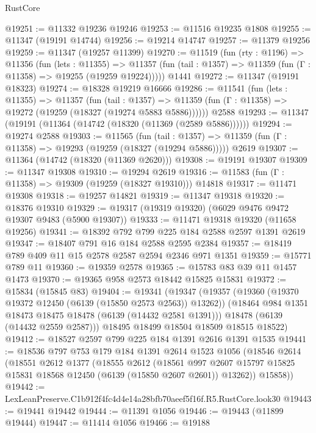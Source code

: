 \begin{lexlean}{RustCore}
\begin{coremodule}
@19251 := @11332 @19236 @19246
@19253 := @11516 @19235 @1808
@19255 := @11347 (@19191 @14744)
@19256 := @19214 @14747
@19257 := @11379 @19256
@19259 := @11347 (@19257 @11399)
@19270 := @11519
    (fun (rty : @1196) =>
    @11356
      (fun (lets : @11355) =>
      @11357 (fun (tail : @1357) => @11359 (fun (Γ : @11358) => @19255 (@19259 @19224)))))
    @1441
@19272 := @11347 (@19191 @18323)
@19274 := @18328 @19219 @16666
@19286 := @11541
    (fun (lets : @11355) =>
    @11357
      (fun (tail : @1357) =>
      @11359 (fun (Γ : @11358) => @19272 (@19259 (@18327 (@19274 @5883 @5886))))))
    @2588
@19293 := @11347 (@19191 (@11364 (@14742 (@18320 (@11369 (@2589 @5886))))))
@19294 := @19274 @2588
@19303 := @11565
    (fun (tail : @1357) => @11359 (fun (Γ : @11358) => @19293 (@19259 (@18327 (@19294 @5886)))))
    @2619
@19307 := @11364 (@14742 (@18320 (@11369 @2620)))
@19308 := @19191 @19307
@19309 := @11347 @19308
@19310 := @19294 @2619
@19316 := @11583 (fun (Γ : @11358) => @19309 (@19259 (@18327 @19310))) @14818
@19317 := @11471 @19308
@19318 := @19257 @14821
@19319 := @11347 @19318
@19320 := @18376 @19310
@19329 := @19317 (@19319 @19320) (@6029 @9476 @9472 @19307 @9483 (@5900 @19307))
@19333 := @11471 @19318 @19320 (@11658 @19256)
@19341 := @18392 @792 @799 @225 @184 @2588 @2597 @1391 @2619
@19347 := @18407 @791 @16 @184 @2588 @2595 @2384
@19357 := @18419 @789 @409 @11 @15 @2578 @2587 @2594 @2346 @971 @1351
@19359 := @15771 @789 @11
@19360 := @19359 @2578
@19365 := @15783 @83 @39 @11 @1457 @1473
@19370 := @19365 @958 @2573 @18442 @15825 @15831
@19372 := @15834 (@15845 @83)
@19404 := @19341
    (@19347
      (@19357
        (@19360 (@19370 @19372 @12450 (@6139 (@15850 @2573 @2563)) @13262))
        (@18464 @984 @1351 @18473 @18475 @18478 (@6139 (@14432 @2581 @1391)))
        @18478
        (@6139 (@14432 @2559 @2587)))
      @18495
      @18499
      @18504
      @18509
      @18515
      @18522)
@19412 := @18527 @2597 @799 @225 @184 @1391 @2616 @1391 @1535
@19441 := @18536
    @797
    @753
    @179
    @184
    @1391
    @2614
    @1523
    @1056
    (@18546
      @2614
      (@18551
        @2612
        @1377
        (@18555
          @2612
          (@18561
            @997
            @2607
            @15797
            @15825
            @15831
            @18568
            @12450
            (@6139 (@15850 @2607 @2601))
            @13262))
        @15858))
@19442 := LexLeanPreserve.C1b912f4fc4d4e14a28bfb70aeef5f16f.R5.RustCore.look30
@19443 := @19441 @19442
@19444 := @11391 @1056
@19446 := @19443 (@11899 @19444)
@19447 := @11414 @1056
@19466 := @19188

\end{coremodule}
\end{lexlean}

